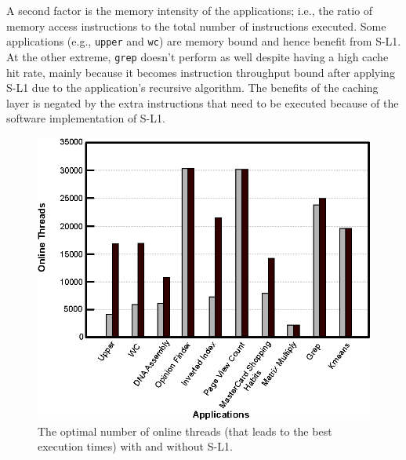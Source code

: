 A second factor is the memory intensity of the applications; i.e., the ratio of memory access instructions to the total number of instructions executed.
Some applications (e.g., \texttt{upper} and \texttt{wc}) are memory bound and hence benefit from S-L1.
At the other extreme, \texttt{grep} doesn't perform as well despite having a
high cache hit rate, mainly because it becomes instruction throughput bound
after applying S-L1 due to the application's recursive algorithm. The benefits of the
caching layer is negated by the extra instructions that need to be executed
because of the software implementation of S-L1.



\begin{figure}[t]
\center
\includegraphics[scale=0.75]{8higherParallelism.eps}
\vspace{-0.0cm}
\caption{\footnotesize\textnormal{The optimal number of online threads (that leads to the best execution times) with and without S-L1.}}
\label{fig:levelprallelism}
\vspace{-0.5cm}
\end{figure}


